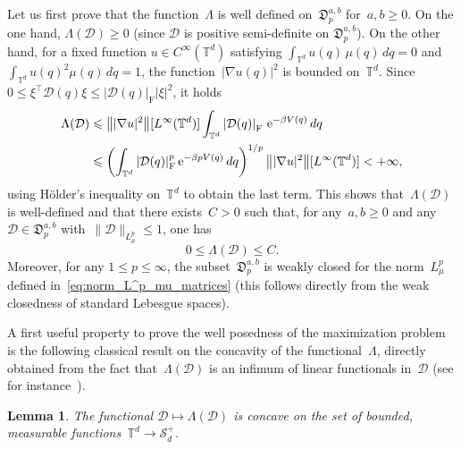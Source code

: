 \documentclass{article}
\newtheorem{lemma}{Lemma}
\newcommand{\rme}{\mathrm{e}}
\renewcommand{\leq}{\leqslant}
\renewcommand{\le}{\leqslant}
\renewcommand{\geq}{\geqslant}
\def\T{\mathbb{T}}
\newcommand{\Diff}{\mathcal{D}}
\newcommand{\Diffset}{\mathfrak{D}}
\newcommand{\F}{\mathrm{F}}
\newcommand{\normF}[1]{\left| #1 \right|_{\F}}
\renewcommand{\dim}{d}
\begin{document}
Let us first prove that the function~$\Lambda$ is well defined on~$\Diffset_p^{a,b}$ for~$a,b \geq 0$. On the one hand, $\Lambda(\Diff)\geq 0$ (since $\Diff$ is positive semi-definite on $\Diffset_p^{a,b}$). On the other hand, for a fixed function $u \in C^{\infty}(\T^\dim)$ satisfying $\int_{\T^\dim}u(q)\, \mu(q) \, dq = 0$ and $\int_{\T^\dim}u(q)^2\mu(q)\,dq = 1$, the function~$|\nabla u(q)|^2$ is bounded on~$\T^\dim$. Since~$0 \leq \xi^\top \Diff(q) \xi \leq \normF{\Diff(q)} |\xi|^2$, %
it holds 
\begin{align}
  \Lambda(\Diff)&\leq \norm{|\nabla u|^2}[L^\infty(\T^\dim)]\int_{\T^\dim}\normF{\Diff(q)}\, \rme^{-\beta V(q)}\,dq \\
  & \leq \left(\int_{\T^\dim}\normF{\Diff(q)}^p \rme^{-\beta p V(q)}\, dq\right)^{1/p} \norm{|\nabla u|^2}[L^\infty(\T^\dim)]<+\infty,
\end{align}
using H\"older's inequality on~$\T^d$ to obtain the last term. This shows that~$\Lambda(\Diff)$ is well-defined and that there exists~$C>0$ such that, for any~$a,b \geq 0$ and any $\Diff \in \Diffset_p^{a,b}$ with~$\|\Diff\|_{L^p_\mu} \leq 1$, one has 
\begin{equation}\label{eq:bounds}
0 \le \Lambda(\Diff) \le C.
\end{equation}
Moreover, for any $1\leq p \leq \infty$, the subset~$\Diffset_{p}^{a,b}$ is weakly closed for the norm~$L^p_\mu$ defined in~\eqref{eq:norm_L^p_mu_matrices} (this follows directly from the weak closedness of standard Lebesgue spaces).

A first useful property to prove the well posedness of the maximization problem is the following classical result on the concavity of the functional~$\Lambda$, directly obtained from the fact that~$\Lambda(\Diff)$ is an infimum of linear functionals in~$\Diff$ (see for instance~\cite[Theorem~10.1.1]{Henrot}).

\begin{lemma}
  \label{lem:concave-mat}
  The functional $\Diff \mapsto\Lambda(\Diff)$ is concave on the set of bounded, measurable functions~$\T^\dim \to \mathcal{S}_\dim^+$.
\end{lemma}
\end{document}
